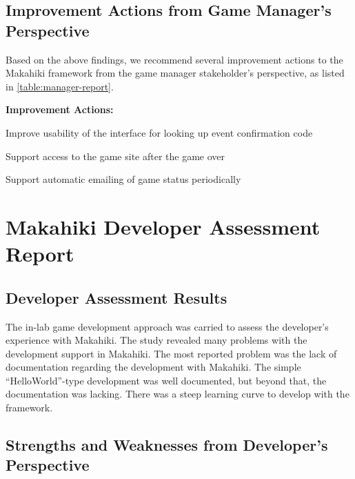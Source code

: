 \subsection{Improvement Actions from Game Manager's Perspective}

Based on the above findings, we recommend several improvement actions to the Makahiki framework from the game manager stakeholder's perspective, as listed in \autoref{table:manager-report}.
     
\begin{table}[ht!]
\begin{shadebox}
{\bf Improvement Actions:}
	\begin{compactenum}
	\item Improve usability of the interface for looking up event confirmation code
	\item Support access to the game site after the game over
	\item Support automatic emailing of game status periodically
	\end{compactenum}
\end{shadebox}
\caption{SGSEAM Improvement Action Report from Game Manager's Perspective}
\label{table:manager-report}
\end{table}

\section{Makahiki Developer Assessment Report}

\subsection{Developer Assessment Results}

The in-lab game development approach was carried to assess the developer's experience with Makahiki. The study revealed many problems with the development support in Makahiki. The most reported problem was the lack of documentation regarding the development with Makahiki. The simple ``HelloWorld''-type development was well documented, but beyond that, the documentation was lacking. There was a steep learning curve to develop with the framework.

\subsection{Strengths and Weaknesses from Developer's Perspective}
    
